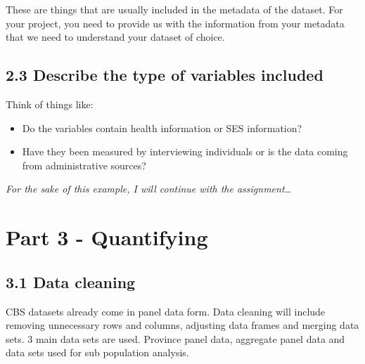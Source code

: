 \documentclass[
]{article}
\begin{document}
These are things that are usually included in the metadata of the
dataset. For your project, you need to provide us with the information
from your metadata that we need to understand your dataset of choice.

\subsection{2.3 Describe the type of variables
included}\label{describe-the-type-of-variables-included}

Think of things like:

\begin{itemize}
\item
  Do the variables contain health information or SES information?
\item
  Have they been measured by interviewing individuals or is the data
  coming from administrative sources?
\end{itemize}

\emph{For the sake of this example, I will continue with the
assignment\ldots{}}

\section{Part 3 - Quantifying}\label{part-3---quantifying}

\subsection{3.1 Data cleaning}\label{data-cleaning}

CBS datasets already come in panel data form. Data cleaning will include
removing unnecessary rows and columns, adjusting data frames and merging
data sets. 3 main data sets are used. Province panel data, aggregate
panel data and data sets used for sub population analysis.
\end{document}
